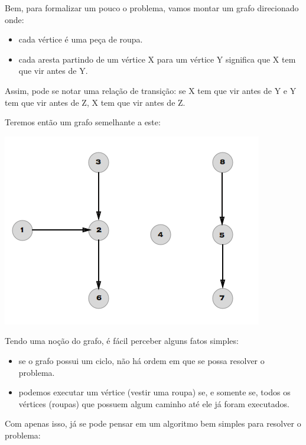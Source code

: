 \documentclass[a4paper,12pt]{article}
\begin{document}
\noindent Bem, para formalizar um pouco o problema, vamos montar um grafo direcionado onde:

\begin{itemize}
    \item cada vértice é uma peça de roupa.
    \item cada aresta partindo de um vértice X para um vértice Y significa que X tem que vir antes de Y.
\end{itemize}

\noindent Assim, pode se notar uma relação de transição: se X tem que vir antes de Y e Y tem que vir antes de Z, X tem que vir antes de Z.

\noindent Teremos então um grafo semelhante a este:

\begin{center}
  \includegraphics[width=\linewidth/2]{figures/grafos/OT.png}
\end{center}

\noindent Tendo uma noção do grafo, é fácil perceber alguns fatos simples:

\begin{itemize}
    \item se o grafo possui um ciclo, não há ordem em que se possa resolver o problema.
    \item podemos executar um vértice (vestir uma roupa) se, e somente se, todos os vértices (roupas) que possuem algum caminho até ele já foram executados.
\end{itemize}

\noindent Com apenas isso, já se pode pensar em um algoritmo bem simples para resolver o problema:
\end{document}
